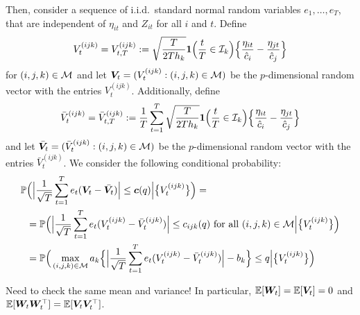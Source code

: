 \documentclass[a4paper,11pt]{article}
\numberwithin{equation}{section}
\begin{document}
Then, consider a sequence of i.i.d.\, standard normal random variables $e_1, \ldots, e_T$, that are independent of $\eta_{it}$ and $Z_{it}$ for all $i$ and $t$. Define 
\begin{equation*}
V^{(ijk)}_t = V^{(ijk)}_{t,T} := \sqrt{\frac{T}{2Th_k}} \boldsymbol{1}\Big(\frac{t}{T} \in \mathcal{I}_k\Big)\Big\{ \frac{\eta_{it}}{\hat{c}_i} - \frac{\eta_{jt}}{\hat{c}_j} \Big\}
\end{equation*}
for $(i,j,k) \in \mathcal{M}$ and let $\boldsymbol{V}_t = (V_t^{(ijk)}: (i,j,k) \in \mathcal{M})$ be the $p$-dimensional random vector with the entries $V_t^{(ijk)}$. Additionally, define 
\begin{equation*}
\bar{V}^{(ijk)}_t = \bar{V}^{(ijk)}_{t,T} := \frac{1}{T} \sum_{t=1}^T \sqrt{\frac{T}{2Th_k}} \boldsymbol{1}\Big(\frac{t}{T} \in \mathcal{I}_k\Big)\Big\{ \frac{\eta_{it}}{\hat{c}_i} - \frac{\eta_{jt}}{\hat{c}_j} \Big\}
\end{equation*}
and let $\bar{\boldsymbol{V}}_t = (\bar{V}_t^{(ijk)}: (i,j,k) \in \mathcal{M})$ be the $p$-dimensional random vector with the entries $\bar{V}_t^{(ijk)}$. We consider the following conditional probability:
\begin{align*}
\mathbb{P} &\Big( \Big| \frac{1}{\sqrt{T}} \sum_{t=1}^T e_t (\boldsymbol{V}_t - \bar{\boldsymbol{V}_t}) \Big| \leq \boldsymbol{c}(q) \Big| \big\{V_t^{(ijk)}\big\} \Big) = \\
 & = \mathbb{P} \Big( \Big|\frac{1}{\sqrt{T}} \sum_{t=1}^T e_t(V^{(ijk)}_t - \bar{V}^{(ijk)}_t )\Big| \le c_{ijk}(q) \text{ for all } (i,j,k) \in \mathcal{M} \Big| \big\{V_t^{(ijk)}\big\}\Big) \\
 & = \mathbb{P} \Big( \max_{(i,j,k) \in \mathcal{M}} a_k \Big\{ \Big|\frac{1}{\sqrt{T}} \sum_{t=1}^Te_t(V^{(ijk)}_t - \bar{V}^{(ijk)}_t )\Big| - b_k \Big\} \le q\Big| \big\{V_t^{(ijk)}\big\} \Big) 
\end{align*}


{\color{red} Need to check the same mean and variance! In particular, $\mathbb{E}[\boldsymbol{W}_t] = \mathbb{E}[\boldsymbol{V}_t] = 0$ and $\mathbb{E}[\boldsymbol{W}_t \boldsymbol{W}_t^\top] = \mathbb{E}[\boldsymbol{V}_t \boldsymbol{V}_t^\top]$.}
\end{document}
